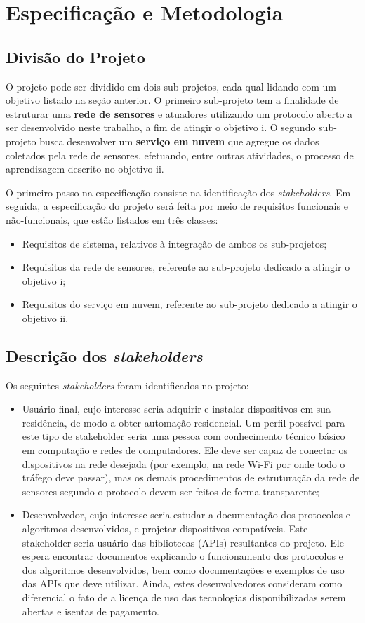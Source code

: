 \chapter{Especificação e Metodologia} \label{chp:espec_metodologia}

\section{Divisão do Projeto}
O projeto pode ser dividido em dois sub-projetos, cada qual lidando com um objetivo listado na seção anterior. O primeiro sub-projeto tem a finalidade de estruturar uma \textbf{rede de sensores} e atuadores utilizando um protocolo aberto a ser desenvolvido neste trabalho, a fim de atingir o objetivo i. O segundo sub-projeto busca desenvolver um \textbf{serviço em nuvem} que agregue os dados coletados pela rede de sensores, efetuando, entre outras atividades, o processo de aprendizagem descrito no objetivo ii.

O primeiro passo na especificação consiste na identificação dos \textit{stakeholders}. Em seguida, a especificação do projeto será feita por meio de requisitos funcionais e não-funcionais, que estão listados em três classes:
\begin{itemize}
	\item Requisitos de sistema, relativos à integração de ambos os sub-projetos;
	\item Requisitos da rede de sensores, referente ao sub-projeto dedicado a atingir o objetivo i; 
	\item Requisitos do serviço em nuvem, referente ao sub-projeto dedicado a atingir o objetivo ii.
\end{itemize}

\section{Descrição dos \textit{stakeholders}}
Os seguintes \textit{stakeholders} foram identificados no projeto:
\begin{itemize}
	\item Usuário final, cujo interesse seria adquirir e instalar dispositivos em sua residência, de modo a obter automação residencial. Um perfil possível para este tipo de stakeholder seria uma pessoa com conhecimento técnico básico em computação e redes de computadores. Ele deve ser capaz de conectar os dispositivos na rede desejada (por exemplo, na rede Wi-Fi por onde todo o tráfego deve passar), mas os demais procedimentos de estruturação da rede de sensores segundo o protocolo devem ser feitos de forma transparente;
	\item Desenvolvedor, cujo interesse seria estudar a documentação dos protocolos e algoritmos desenvolvidos, e projetar dispositivos compatíveis. Este stakeholder seria usuário das bibliotecas (APIs) resultantes do projeto. Ele espera encontrar documentos explicando o funcionamento dos protocolos e dos algoritmos desenvolvidos, bem como documentações e exemplos de uso das APIs que deve utilizar. Ainda, estes desenvolvedores consideram como diferencial o fato de a licença de uso das tecnologias disponibilizadas serem abertas e isentas de pagamento.
\end{itemize}

